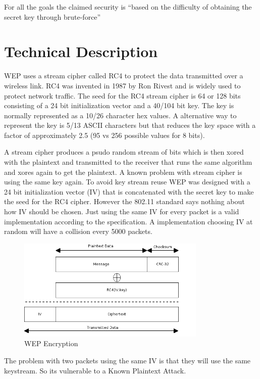 \documentclass[twocolumn,11pt]{IEEEtran}
\begin{document}
For all the goals the claimed security is ``based on the difficulty of obtaining the secret key through brute-force'' \cite{IEEE:Fast}



\section {Technical Description}
\label{sec:technical_description}

WEP uses a stream cipher called RC4 to protect the data transmitted over a wireless link. RC4 was invented in 1987 by Ron Rivest and is widely used to protect network traffic. The seed for the RC4 stream cipher is 64 or 128 bits consisting of a 24 bit initialization vector and a 40/104 bit key. The key is normally represented as a 10/26 character hex values. A alternative way to represent the key is 5/13 ASCII characters but that reduces the key space with a factor of approximately 2.5 (95 vs 256 possible values for 8 bits).

A stream cipher produces a psudo random stream of bits which is then xored with the plaintext and transmitted to the receiver that runs the same algorithm and xores again to get the plaintext. A known problem with stream cipher is using the same key again. To avoid key stream reuse WEP was designed with a 24 bit initialization vector (IV) that is concatenated with the secret key to make the seed for the RC4 cipher. However the 802.11 standard says nothing about how IV should be chosen. Just using the same IV for every packet is a valid implementation according to the specification. A implementation choosing IV at random will have a collision every 5000 packets\cite{Borisov:New}. 

\begin{figure}
\includegraphics[width=90mm]{WEP_Encryption.png}
\caption{WEP Encryption}
\end{figure}

The problem with two packets using the same IV is that they will use the same keystream. So its vulnerable to a Known Plaintext Attack.
\end{document}
